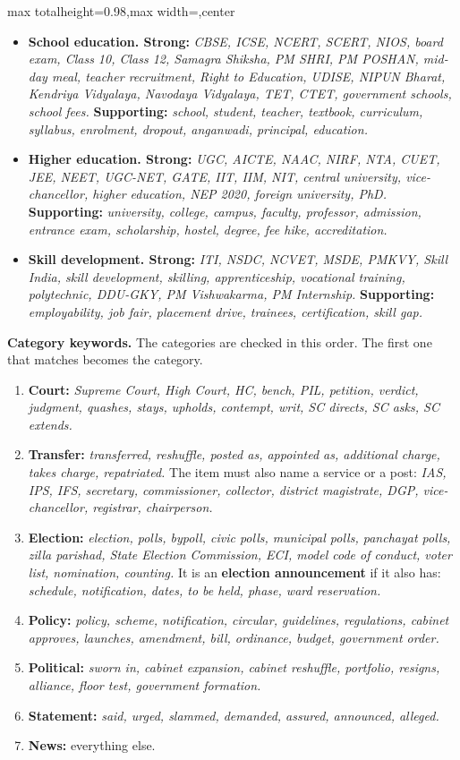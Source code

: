 \documentclass[10pt,a4paper]{article}
\newcommand{\kw}[1]{\textit{#1}}
\newcommand{\lbl}[1]{\textbf{#1}}
\begin{document}
\begin{adjustbox}{max totalheight=0.98\textheight,max width=\textwidth,center}
\begin{minipage}{\textwidth}
\begin{itemize}
  \item \lbl{School education. Strong:} \kw{CBSE, ICSE, NCERT, SCERT, NIOS, board exam, Class 10, Class 12, Samagra Shiksha, PM SHRI, PM POSHAN, mid-day meal, teacher recruitment, Right to Education, UDISE, NIPUN Bharat, Kendriya Vidyalaya, Navodaya Vidyalaya, TET, CTET, government schools, school fees.} \lbl{Supporting:} \kw{school, student, teacher, textbook, curriculum, syllabus, enrolment, dropout, anganwadi, principal, education.}
  \item \lbl{Higher education. Strong:} \kw{UGC, AICTE, NAAC, NIRF, NTA, CUET, JEE, NEET, UGC-NET, GATE, IIT, IIM, NIT, central university, vice-chancellor, higher education, NEP 2020, foreign university, PhD.} \lbl{Supporting:} \kw{university, college, campus, faculty, professor, admission, entrance exam, scholarship, hostel, degree, fee hike, accreditation.}
  \item \lbl{Skill development. Strong:} \kw{ITI, NSDC, NCVET, MSDE, PMKVY, Skill India, skill development, skilling, apprenticeship, vocational training, polytechnic, DDU-GKY, PM Vishwakarma, PM Internship.} \lbl{Supporting:} \kw{employability, job fair, placement drive, trainees, certification, skill gap.}
\end{itemize}

\lbl{Category keywords.} The categories are checked in this order. The first one that matches becomes the category.

\begin{enumerate}
  \item \lbl{Court:} \kw{Supreme Court, High Court, HC, bench, PIL, petition, verdict, judgment, quashes, stays, upholds, contempt, writ, SC directs, SC asks, SC extends.}
  \item \lbl{Transfer:} \kw{transferred, reshuffle, posted as, appointed as, additional charge, takes charge, repatriated.} The item must also name a service or a post: \kw{IAS, IPS, IFS, secretary, commissioner, collector, district magistrate, DGP, vice-chancellor, registrar, chairperson.}
  \item \lbl{Election:} \kw{election, polls, bypoll, civic polls, municipal polls, panchayat polls, zilla parishad, State Election Commission, ECI, model code of conduct, voter list, nomination, counting.} It is an \lbl{election announcement} if it also has: \kw{schedule, notification, dates, to be held, phase, ward reservation.}
  \item \lbl{Policy:} \kw{policy, scheme, notification, circular, guidelines, regulations, cabinet approves, launches, amendment, bill, ordinance, budget, government order.}
  \item \lbl{Political:} \kw{sworn in, cabinet expansion, cabinet reshuffle, portfolio, resigns, alliance, floor test, government formation.}
  \item \lbl{Statement:} \kw{said, urged, slammed, demanded, assured, announced, alleged.}
  \item \lbl{News:} everything else.
\end{enumerate}


\end{minipage}
\end{adjustbox}
\end{document}
